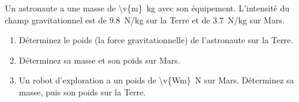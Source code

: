 Un astronaute a une masse de \qty{\v{m}}{kg} avec son équipement. L'intensité du champ gravitationnel est de \qty{9.8}{N/kg} sur la Terre et de \qty{3.7}{N/kg} sur Mars.

\begin{enumerate}[label=\alph*)]
    \item Déterminez le poids (la force gravitationnelle) de l'astronaute sur la Terre.
    \item Déterminez sa masse et son poids sur Mars.
    \item Un robot d'exploration a un poids de \qty{\v{Wm}}{N} sur Mars. Déterminez sa masse, puis son poids sur la Terre.
\end{enumerate}
